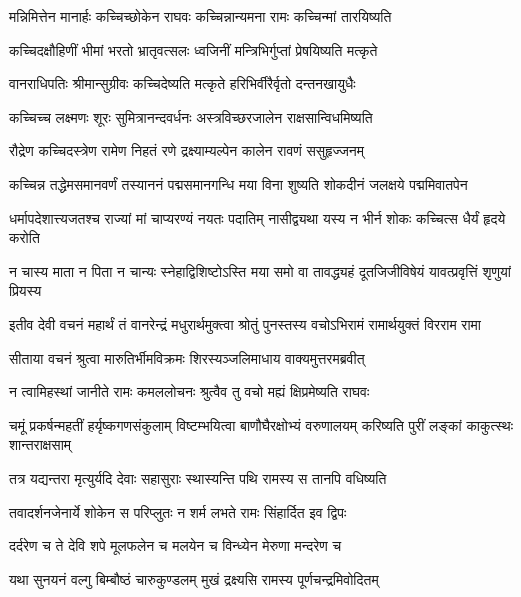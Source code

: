 \twolineshloka
{मन्निमित्तेन मानार्हः कच्चिच्छोकेन राघवः}
{कच्चिन्नान्यमना रामः कच्चिन्मां तारयिष्यति} %

\twolineshloka
{कच्चिदक्षौहिणीं भीमां भरतो भ्रातृवत्सलः}
{ध्वजिनीं मन्त्रिभिर्गुप्तां प्रेषयिष्यति मत्कृते} %

\twolineshloka
{वानराधिपतिः श्रीमान्सुग्रीवः कच्चिदेष्यति}
{मत्कृते हरिभिर्वीरैर्वृतो दन्तनखायुधैः} %

\twolineshloka
{कच्चिच्च लक्ष्मणः शूरः सुमित्रानन्दवर्धनः}
{अस्त्रविच्छरजालेन राक्षसान्विधमिष्यति} %

\twolineshloka
{रौद्रेण कच्चिदस्त्रेण रामेण निहतं रणे}
{द्रक्ष्याम्यल्पेन कालेन रावणं ससुहृज्जनम्} %

\fourlineindentedshloka
{कच्चिन्न तद्धेमसमानवर्णं}
{ तस्याननं पद्मसमानगन्धि}
{मया विना शुष्यति शोकदीनं}
{ जलक्षये पद्ममिवातपेन} %

\fourlineindentedshloka
{धर्मापदेशात्त्यजतश्च राज्यां}
{ मां चाप्यरण्यं नयतः पदातिम्}
{नासीद्व्यथा यस्य न भीर्न शोकः}
{ कच्चित्स धैर्यं हृदये करोति} %

\fourlineindentedshloka
{न चास्य माता न पिता न चान्यः}
{ स्नेहाद्विशिष्टोऽस्ति मया समो वा}
{तावद्ध्यहं दूतजिजीविषेयं}
{ यावत्प्रवृत्तिं शृणुयां प्रियस्य} %

\fourlineindentedshloka
{इतीव देवी वचनं महार्थं}
{ तं वानरेन्द्रं मधुरार्थमुक्त्वा}
{श्रोतुं पुनस्तस्य वचोऽभिरामं}
{ रामार्थयुक्तं विरराम रामा} %

\twolineshloka
{सीताया वचनं श्रुत्वा मारुतिर्भीमविक्रमः}
{शिरस्यञ्जलिमाधाय वाक्यमुत्तरमब्रवीत्} %

\twolineshloka
{न त्वामिहस्थां जानीते रामः कमललोचनः}
{श्रुत्वैव तु वचो मह्यं क्षिप्रमेष्यति राघवः} %

\threelineshloka
{चमूं प्रकर्षन्महतीं हर्यृष्कगणसंकुलाम्}
{विष्टम्भयित्वा बाणौघैरक्षोभ्यं वरुणालयम्}
{करिष्यति पुरीं लङ्कां काकुत्स्थः शान्तराक्षसाम्} %

\twolineshloka
{तत्र यद्यन्तरा मृत्युर्यदि देवाः सहासुराः}
{स्थास्यन्ति पथि रामस्य स तानपि वधिष्यति} %

\twolineshloka
{तवादर्शनजेनार्ये शोकेन स परिप्लुतः}
{न शर्म लभते रामः सिंहार्दित इव द्विपः} %

\twolineshloka
{दर्दरेण च ते देवि शपे मूलफलेन च}
{मलयेन च विन्ध्येन मेरुणा मन्दरेण च} %

\twolineshloka
{यथा सुनयनं वल्गु बिम्बौष्ठं चारुकुण्डलम्}
{मुखं द्रक्ष्यसि रामस्य पूर्णचन्द्रमिवोदितम्} %

